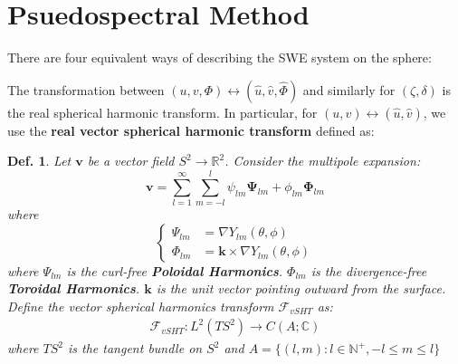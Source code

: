 \documentclass[14pt]{extarticle}
\newenvironment{tbox}{
    \begin{tcolorbox}[colframe=white,sharp corners]
    
}{
    \end{tcolorbox}
}
\newtheorem{df}{Def.}
\renewcommand{\vec}[1]{\mathbf{#1}}
\begin{document}
\section{Psuedospectral Method}
There are four equivalent ways of describing the SWE system on the sphere:
\begin{figure}[h]
    \centering
    
\end{figure}

The transformation between $(u,v, \Phi)\leftrightarrow (\hat u, \hat v, \hat \Phi)$ and similarly for $(\zeta, \delta)$
is the real spherical harmonic transform. In particular, for $(u,v)\leftrightarrow (\hat u, \hat v)$, we use the \textbf{real vector spherical harmonic transform}
defined as:

\begin{tbox}
    \begin{df}
        Let $\mathbf{v}$ be a vector field $S^2\to \mathbb{R}^2$. Consider the multipole expansion:
        \begin{equation}
            \mathbf{v} = \sum_{l=1}^{\infty} \sum_{m=-l}^l \psi_{lm}\boldsymbol{\Psi}_{lm} +  \phi_{lm}\boldsymbol{\Phi}_{lm}
        \end{equation}
        where 
        $$
        \begin{cases}
            \Psi_{lm} &= \nabla Y_{lm}(\theta,\phi) \\ 
            \Phi_{lm} &= \vec k\times \nabla Y_{lm}(\theta,\phi)
        \end{cases}
        $$
        where $\Psi_{lm}$ is the curl-free \textbf{Poloidal Harmonics}.
        $\Phi_{lm}$ is the divergence-free \textbf{Toroidal Harmonics}.
        $\vec k$ is the unit vector pointing outward from the surface.
        Define the vector spherical harmonics transform $\mathcal F_{vSHT}$ as:
        \begin{align}
            \mathcal F_{vSHT} : L^2(TS^2) \to C(A;\mathbb{C})
        \end{align}
        where $TS^2$ is the tangent bundle on $S^2$ and $A=\{(l,m):l\in \mathbb{N}^+,-l\leq m\leq l\}$
    \end{df} 
\end{tbox}
\end{document}
